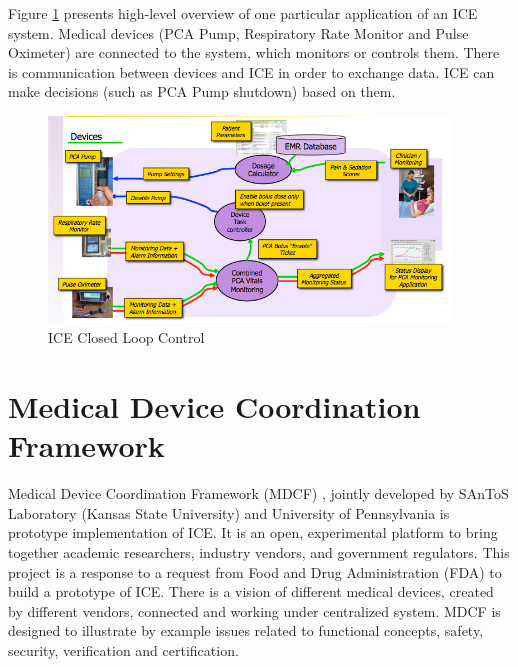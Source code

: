 Figure \ref{figure:ice} presents high-level overview of one particular application of an ICE system. Medical devices (PCA Pump, Respiratory Rate Monitor and Pulse Oximeter) are connected to the system, which monitors or controls them. There is communication between devices and ICE in order to exchange data. ICE can make decisions (such as PCA Pump shutdown) based on them.

\begin{figure}[ht]%
    \begin{center}
    	\includegraphics[width=0.95\textwidth]{figures/ice.png}   	
    \end{center}
    \caption{ICE Closed Loop Control}
    \label{figure:ice}
\end{figure}


\section{Medical Device Coordination Framework}
\label{background:mdcf}

Medical Device Coordination Framework (MDCF) \cite{MedicalApplicationPlatforms:Paper}, jointly developed by SAnToS Laboratory (Kansas State University) and University of Pennsylvania is prototype implementation of ICE. It is an open, experimental platform to bring together academic researchers, industry vendors, and government regulators. This project is a response to a request from Food and Drug Administration (FDA) to build a prototype of ICE. There is a vision of different medical devices, created by different vendors, connected and working under centralized system. MDCF is designed to illustrate by example issues related to functional concepts, safety, security, verification and certification. 

